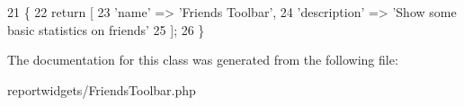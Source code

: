 \begin{DoxyCode}
21     \{
22         \textcolor{keywordflow}{return} [
23             \textcolor{stringliteral}{'name'}        => \textcolor{stringliteral}{'Friends Toolbar'},
24             \textcolor{stringliteral}{'description'} => \textcolor{stringliteral}{'Show some basic statistics on friends'}
25         ];
26     \}
\end{DoxyCode}


The documentation for this class was generated from the following file\+:\begin{DoxyCompactItemize}
\item 
reportwidgets/Friends\+Toolbar.\+php\end{DoxyCompactItemize}
